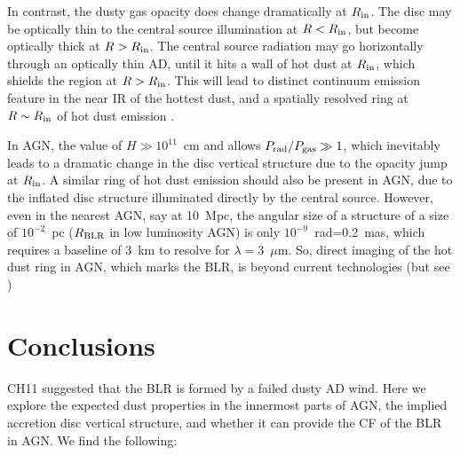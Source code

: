\documentclass[a4paper,fleqn,usenatbib]{mnras}
\newcommand{\mic}{\mbox{$\mu$m}}
\begin{document}
In contrast, the dusty gas opacity does change dramatically at $R_{\rm in}$. The disc may be optically thin
to the central source illumination at $R<R_{\rm in}$, but become optically thick at $R>R_{\rm in}$.
The central source radiation may go horizontally through an optically thin AD, until it hits a wall 
of hot dust at $R_{\rm in}$, which shields the region at $R>R_{\rm in}$. This will lead to distinct continuum
emission feature in the near IR of the hottest dust, and a spatially resolved ring at $R\sim R_{\rm in}$
of hot dust emission \citep{Dullemond10}.

In AGN, the value of $H\gg 10^{11}$~cm and allows $P_{\rm rad}/P_{\rm gas}\gg 1$, which inevitably leads
to a dramatic change in the disc vertical structure due to the opacity jump at $R_{\rm in}$. 
A similar ring of hot dust emission should also be present in AGN,
due to the inflated disc structure illuminated directly by the central source. However, even in the nearest AGN,
say at 10~Mpc, the angular size of a structure of a size of $10^{-2}$~pc ($R_{\rm BLR}$ in low luminosity AGN)
is only $10^{-9}$~rad=0.2~mas, which requires a baseline of 3~km to resolve for $\lambda=3$~\mic.
So, direct imaging of the hot dust ring in AGN, which marks the BLR, is beyond current technologies
(but see \citealt*{Stern15})




\section{Conclusions} \label{sec:conclusions}

CH11 suggested that the BLR is formed by a failed dusty AD wind. Here we explore the expected dust properties in the innermost parts of AGN, the implied accretion disc vertical structure, and 
whether it can provide the CF of the BLR in AGN. We find the following:
\end{document}
